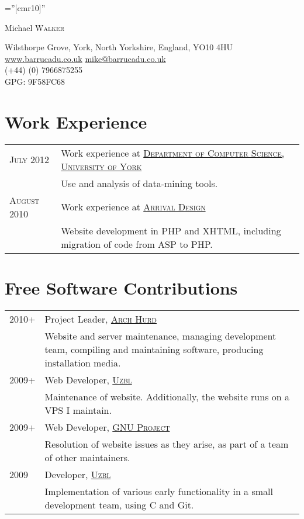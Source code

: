 \documentclass[a4paper,10pt]{article}
\newcommand{\schref}[2]{\href{#1}{\textsc{#2}}}
\newcommand{\mhref}[1]{\href{mailto:#1}{#1}}
\newcommand{\hhref}[1]{\href{http://#1}{#1}}
\newenvironment{cvtable}{\begin{tabular}{x{2cm}|p{11.6cm}}}{\end{tabular}}
\newcommand{\rowhead}[1]{\textsc{#1} &}
\newcommand{\rowdetail}[1]{& \footnotesize{#1}}
\begin{document}
\pagestyle{empty} %

\font\fb=''[cmr10]'' %

\par{\centering
		{\Huge Michael \textsc{Walker}
	}\bigskip\par}

{ Wilsthorpe Grove, York, North Yorkshire, England, YO10 4HU\\
\hhref{www.barrucadu.co.uk} \mhref{mike@barrucadu.co.uk}\\
(+44) (0) 7966875255\\
GPG: 9F58FC68\\
}

\section{Work Experience}
\begin{cvtable}
  \rowhead{July 2012} Work experience at \schref{http://cs.york.ac.uk}{Department of Computer Science, University of York} \\
  \rowdetail{Use and analysis of data-mining tools.} \\

  \rowhead{August 2010} Work experience at \schref{http://www.arrivaldesign.co.uk/}{Arrival Design} \\
  \rowdetail{Website development in PHP and XHTML, including migration of code from ASP to PHP.}
\end{cvtable}

\section{Free Software Contributions}
\begin{cvtable}
  \rowhead{2010+} Project Leader, \schref{http://www.archhurd.org}{Arch Hurd}\\
  \rowdetail{Website and server maintenance, managing development team, compiling and maintaining software, producing installation media.}\\

  \rowhead{2009+} Web Developer, \schref{http://www.uzbl.org}{Uzbl}\\
  \rowdetail{Maintenance of website. Additionally, the website runs on a VPS I maintain.}\\

  \rowhead{2009+} Web Developer, \schref{http://www.gnu.org}{GNU Project}\\
  \rowdetail{Resolution of website issues as they arise, as part of a team of other maintainers.}\\

  \rowhead{2009}  Developer, \schref{http://www.uzbl.org}{Uzbl}\\
  \rowdetail{Implementation of various early functionality in a small development team, using C and Git.}
\end{cvtable}
\end{document}
